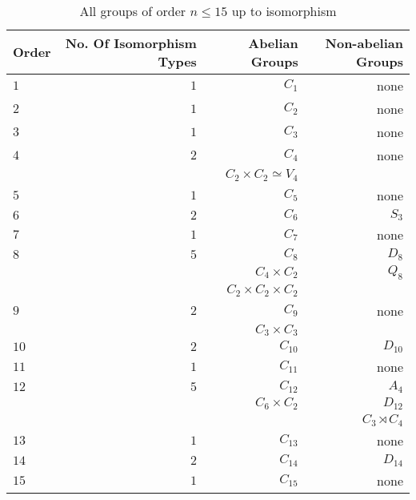 \begin{center}
  \begin{table}~\label{tbl:all-groups}
    \begin{tabular}{ l | r | r | r }
      Order & No. Of Isomorphism Types & Abelian Groups & Non-abelian Groups \\
      \midrule
      $1$ & $1$ & $C_1$ & none \\
      \midrule
      $2$ & $1$ & $C_2$ & none \\
      \midrule
      $3$ & $1$ & $C_3$ & none \\
      \midrule
      $4$ & $2$ & $C_4$ & none \\
          &     & $C_2 \times C_2 \simeq V_4$ & \\
      \midrule
      $5$ & $1$ & $C_5$ & none \\
      \midrule
      $6$ & $2$ & $C_6$ & $S_3$ \\
      \midrule
      $7$ & $1$ & $C_7$ & none \\
      \midrule
      $8$ & $5$ & $C_8$ & $D_8$ \\
          &     & $C_4 \times C_2$ & $Q_8$ \\
          &     & $C_2 \times C_2 \times C_2$ &    \\
      \midrule
      $9$ & $2$ & $C_9$ & none \\
          &     & $C_3 \times C_3$ & \\
      \midrule
      $10$ & $2$ & $C_{10}$ & $D_{10}$ \\
      \midrule
      $11$ & $1$ & $C_{11}$ & none \\
      \midrule
      $12$ & $5$ & $C_{12}$ & $A_4$ \\
          &     & $C_6 \times C_2$ & $D_{12}$ \\
          &     &   & $C_3 \rtimes C_4$ \\
      \midrule
      $13$ & $1$ & $C_{13}$ & none \\
      \midrule
      $14$ & $2$ & $C_{14}$ & $D_{14}$ \\
      \midrule
      $15$ & $1$ & $C_{15}$ & none \\
      \bottomrule
    \end{tabular}
  \caption{All groups of order $n \le 15$ up to isomorphism}~\label{tab:groups-n-15}
  \end{table}
\end{center}

\newpage

